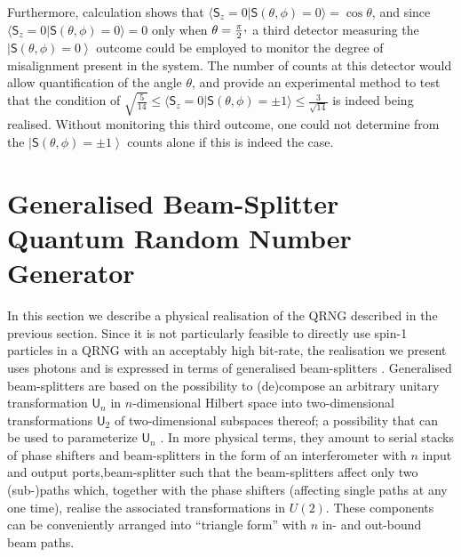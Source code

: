 \documentclass[%
 preprint,
 showpacs,
 showkeys,
 amsmath,
 amssymb,
 aps,
 pra,
 ]{revtex4-1}
\theoremstyle{definition}
\newcommand{\ket}[1]{\left| #1 \right>}
\newcommand{\iprod}[2]{\langle #1 | #2 \rangle}
\begin{document}
Furthermore, calculation shows that $\iprod{\textsf{S}_z=0}{\textsf{S}(\theta,\phi)=0}=\cos\theta$, and since $\iprod{\textsf{S}_z=0}{\textsf{S}(\theta,\phi)=0}=0$ only when $\theta=\frac{\pi}{2}\raisebox{.8mm}{,}$ a third detector measuring the $\ket{\textsf{S}(\theta,\phi)=0}$ outcome could be employed to monitor the degree of misalignment present in the system.
The number of counts at this detector would allow quantification of the angle $\theta$, and provide an experimental method to test that the condition of $\sqrt{\frac{5}{14}} \le \iprod{\textsf{S}_z=0}{\textsf{S}(\theta,\phi)=\pm 1}\le \frac{3}{\sqrt{14}}$ is indeed being realised.
Without monitoring this third outcome, one could not determine from the $\ket{\textsf{S}(\theta,\phi)=\pm 1}$ counts alone if this is indeed the case.


\section{Generalised Beam-Splitter Quantum Random Number Generator}
\label{sec:experiment}

In this section we describe a physical realisation of the QRNG described in the previous section.
Since it is not particularly feasible to directly use spin-1 particles
in a QRNG with an acceptably high bit-rate, the realisation we present uses photons and is expressed
in terms of generalised beam-splitters \cite{rzbb,zukowski-97,svozil-2004-analog}.
Generalised beam-splitters are based on the possibility to (de)compose
an arbitrary unitary transformation $\textsf{U}_n$ in $n$-dimensional Hilbert space
into two-dimensional transformations $\textsf{U}_2$ of two-dimensional subspaces thereof;
a possibility that can be used to parameterize $\textsf{U}_n$ \cite{murnaghan}.
In more physical terms, they amount to serial stacks of phase shifters and beam-splitters
in the form of an interferometer with $n$ input and output ports,beam-splitter
such that the beam-splitters affect only two (sub\nobreakdash-)paths
which, together with the phase shifters (affecting single paths at any one time),
realise the associated transformations in $U(2)$.
These components can be conveniently arranged into ``triangle form''
with $n$ in- and out-bound beam paths.
\end{document}
